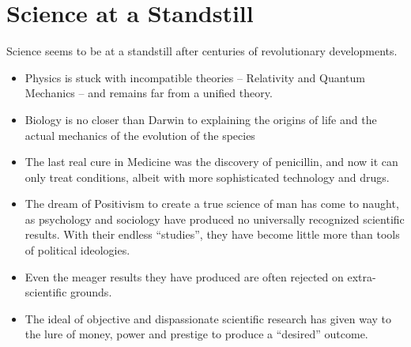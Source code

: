 \section{Science at a Standstill}

Science seems to be at a standstill after centuries of revolutionary developments.

\begin{itemize}


\item Physics is stuck with incompatible theories -- Relativity and Quantum Mechanics -- and remains far from a unified theory.

\item Biology is no closer than Darwin to explaining the origins of life and the actual mechanics of the evolution of the species

\item The last real cure in Medicine was the discovery of penicillin, and now it can only treat conditions, albeit with more sophisticated technology and drugs.

\item The dream of Positivism to create a true science of man has come to naught, as psychology and sociology have produced no universally recognized scientific results. With their endless ``studies'', they have become little more than tools of political ideologies.

\item Even the meager results they have produced are often rejected on extra-scientific grounds.

\item The ideal of objective and dispassionate scientific research has given way to the lure of money, power and prestige to produce a ``desired'' outcome.
\end{itemize}




